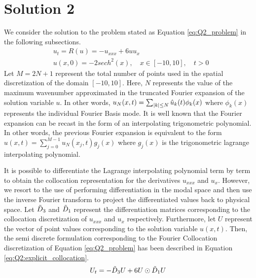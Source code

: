 \documentclass[12pt]{article}
\DeclarePairedDelimiter\abs{\lvert}{\rvert}
\begin{document}
\section{Solution 2}
We consider the solution to the problem stated as Equation \ref{eq:Q2_problem} in the following subsections.
\begin{equation}
\begin{aligned}
& u_t = R(u) = -u_{xxx} + 6uu_x \\
& u(x, 0) = -2sech^2(x), \quad x \in [-10, 10], \quad t > 0
\end{aligned}
\label{eq:Q2_problem}
\end{equation}
Let $M = 2N + 1$ represent the total number of points used in the spatial discretization of the domain $[-10, 10]$. Here, $N$ represents the value of the maximum wavenumber approximated in the truncated Fourier expansion of the solution variable $u$. In other words, $u_N(x, t) = \sum_{\abs{k} \leq N} \hat{u}_k(t) \phi_k(x)$ where $\phi_k(x)$ represents the individual Fourier Basis mode. It is well known that the Fourier expansion can be recast in the form of an interpolating trigonometric polynomial. In other words, the previous Fourier expansion is equivalent to the form $u(x, t) = \sum_{j = 0}^{M - 1} u_N(x_j, t) g_j(x)$ where $g_j(x)$ is the trigonometric lagrange interpolating polynomial.

It is possible to differentiate the Lagrange interpolating polynomial term by term to obtain the collocation representation for the derivatives $u_{xxx}$ and $u_x$. However, we resort to the use of performing differentiation in the modal space and then use the inverse Fourier transform to project the differentiated values back to physical space. Let $\Tilde{D}_3$ and $\Tilde{D}_1$ represent the differentiation matrices corresponding to the collocation discretization of $u_{xxx}$ and $u_x$ respectively. Furthermore, let $U$ represent the vector of point values corresponding to the solution variable $u(x, t)$. Then, the semi discrete formulation corresponding to the Fourier Collocation discretization of Equation \ref{eq:Q2_problem} has been described in Equation \ref{eq:Q2:explicit_collocation}.
\begin{equation}
\begin{aligned}
    U_t = -\Tilde{D}_3 U + 6U \odot \Tilde{D}_1 U
\end{aligned}
\label{eq:Q2:explicit_collocation}     
\end{equation}
\end{document}
